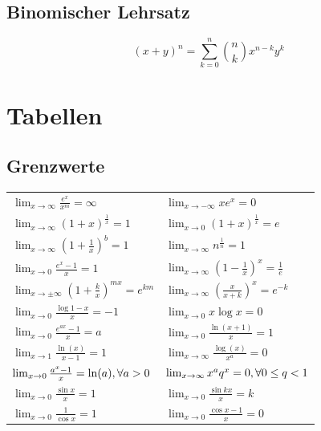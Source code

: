 \documentclass[a4paper,10pt]{article}
\def\limxo{\lim_{x\to 0}}
\def\limxi{\lim_{x\to\infty}}
\def\limxn{\lim_{x\to-\infty}}
\begin{document}
\subsection{Binomischer Lehrsatz}

$$(x+y)^n = \sum_{k=0}^n {n \choose k} x^{n-k} y^k$$

\section{Tabellen}

\subsection{Grenzwerte}

\begin{center}
	\begin{tabularx}{\linewidth}{XX}
		\toprule
		$\limxi \frac{e^x}{x^m} = \infty$                          & $\limxn xe^x = 0$                        \\
		$\limxi (1+x)^{\frac{1}{x}} = 1$                           & $\limxo (1+x)^{\frac{1}{x}} = e$         \\
		$\limxi (1+\frac{1}{x})^b = 1$                             & $\limxi n^{\frac{1}{n}} = 1$             \\
		$\limxo \frac{e^x-1}{x} = 1$                               & $\limxi (1-\frac{1}{x})^x = \frac{1}{e}$ \\
		$\lim_{x\to\pm\infty} (1 + \frac{k}{x})^{mx} = e^{km}$     & $\limxi (\frac{x}{x+k})^x = e^{-k}$      \\
		$\limxo \frac{\log 1 - x}{x} = -1$                         & $\limxo x \log x = 0$                    \\
		$\limxo \frac{e^{ax}-1}{x} = a$                            & $\limxo \frac{\ln(x+1)}{x} = 1$          \\
		$\lim_{x\to 1} \frac{\ln(x)}{x-1} = 1$                     & $\limxi \frac{\log(x)}{x^a} = 0$         \\
		$\limxo \frac{a^x -1}{x} = \ln(a), \newline \forall a > 0$ &
		$\limxi x^a q^x = 0, \newline \forall 0 \le q < 1$                                                    \\
		$\limxo \frac{\sin x}{x} = 1$                              & $\limxo \frac{\sin kx}{x} = k$           \\
		$\limxo \frac{1}{\cos x} = 1$                              & $\limxo \frac{\cos x -1}{x} = 0$         \\

\end{tabularx}
\end{center}
\end{document}
